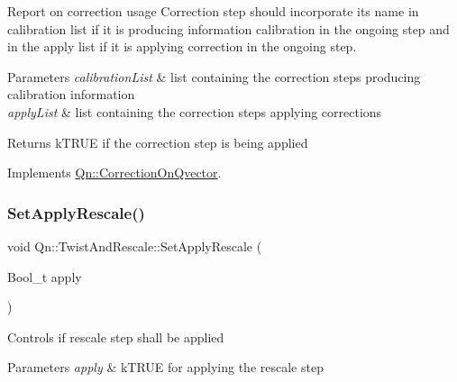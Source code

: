 Report on correction usage Correction step should incorporate its name in calibration list if it is producing information calibration in the ongoing step and in the apply list if it is applying correction in the ongoing step. 
\begin{DoxyParams}{Parameters}
{\em calibration\+List} & list containing the correction steps producing calibration information \\
\hline
{\em apply\+List} & list containing the correction steps applying corrections \\
\hline
\end{DoxyParams}
\begin{DoxyReturn}{Returns}
k\+T\+R\+UE if the correction step is being applied 
\end{DoxyReturn}


Implements \mbox{\hyperlink{classQn_1_1CorrectionOnQvector_a322860c299f0ca1db46ddd57c0828ba1}{Qn\+::\+Correction\+On\+Qvector}}.

\mbox{\label{classQn_1_1TwistAndRescale_ace713dca5b5d051583aa6821d40a35b3}} 
\subsubsection{\texorpdfstring{Set\+Apply\+Rescale()}{SetApplyRescale()}}
{\footnotesize\ttfamily void Qn\+::\+Twist\+And\+Rescale\+::\+Set\+Apply\+Rescale (\begin{DoxyParamCaption}\item[{Bool\+\_\+t}]{apply }\end{DoxyParamCaption})\hspace{0.3cm}{\ttfamily [inline]}}

Controls if rescale step shall be applied 
\begin{DoxyParams}{Parameters}
{\em apply} & k\+T\+R\+UE for applying the rescale step \\
\hline
\end{DoxyParams}
\mbox{\label{classQn_1_1TwistAndRescale_a3b8c1bb7d3ef535904dc6705d6f152d9}} 
